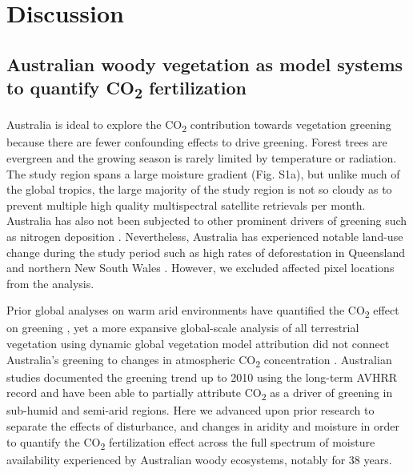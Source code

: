 \documentclass[gc, manuscript]{copernicus}
\begin{document}
\section{Discussion}

\subsection{\texorpdfstring{Australian woody vegetation as model systems
to quantify CO\textsubscript{2}
fertilization}{Australian woody vegetation as model systems to quantify CO2 fertilization}}

Australia is ideal to explore the CO\textsubscript{2} contribution
towards vegetation greening because there are fewer confounding effects
to drive greening. Forest trees are evergreen and the growing season is
rarely limited by temperature or radiation. The study region spans a
large moisture gradient (Fig. S1a), but unlike much of the global
tropics, the large majority of the study region is not so cloudy as to
prevent multiple high quality multispectral satellite retrievals per
month. Australia has also not been subjected to other prominent drivers
of greening such as nitrogen deposition
\citep{ackermanGlobalEstimatesInorganic2019}. Nevertheless, Australia
has experienced notable land-use change during the study period such as
high rates of deforestation in Queensland and northern New South Wales
\citep{evansDeforestationAustraliaDrivers2016}. However, we excluded
affected pixel locations from the analysis.

Prior global analyses on warm arid environments have quantified the
CO\textsubscript{2} effect on greening
\citep{donohueImpactCOFertilization2013b}, yet a more expansive
global-scale analysis of all terrestrial vegetation using dynamic global
vegetation model attribution did not connect Australia's greening to
changes in atmospheric CO\textsubscript{2} concentration
\citep{zhuGreeningEarthIts2016a}. Australian studies documented the
greening trend up to 2010 using the long-term AVHRR record
\citep{donohueClimaterelatedTrendsAustralian2009c, ukkolaReducedStreamflowWaterstressed2016b}
and have been able to partially attribute CO\textsubscript{2} as a
driver of greening in sub-humid and semi-arid regions. Here we advanced
upon prior research to separate the effects of disturbance, and changes
in aridity and moisture in order to quantify the CO\textsubscript{2}
fertilization effect across the full spectrum of moisture availability
experienced by Australian woody ecosystems, notably for 38 years.
\end{document}
